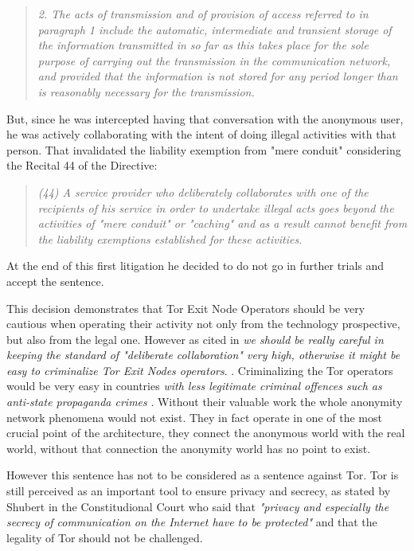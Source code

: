 \documentclass[runningheads,a4paper]{llncs}
\begin{document}
\begin{quote}
    \textit{2. The acts of transmission and of provision of access referred to in paragraph 1 include the automatic, intermediate and transient storage of the information transmitted in so far as this takes place for the sole purpose of carrying out the transmission in the communication network, and provided that the information is not stored for any period longer than is reasonably necessary for the transmission.}
\end{quote}

But, since he was intercepted having that conversation with the anonymous user, he was actively collaborating with the intent of doing illegal activities with that person. That invalidated the liability exemption from "mere conduit" considering the Recital 44 of the Directive:

\begin{quote}
    \textit{
(44) A service provider who deliberately collaborates with one of the recipients of his service in order to undertake illegal acts goes beyond the activities of "mere conduit" or "caching" and as a result cannot benefit from the liability exemptions established for these activities.}
\end{quote}

At the end of this first litigation he decided to do not go in further trials and accept the sentence.

This decision demonstrates that Tor Exit Node Operators should be very cautious when operating their activity not only from the technology prospective, but also from the legal one. However as cited in \cite{HUSOVEC} \textit{we should be really careful in keeping the standard of "deliberate collaboration" very high, otherwise it might be easy to criminalize Tor Exit Nodes operators}. . Criminalizing the Tor operators would be very easy in countries \textit{with less legitimate criminal offences such as anti-state propaganda crimes} \cite{HUSOVEC}. Without their valuable work the whole anonymity network phenomena would not exist. They in fact operate in one of the most crucial point of the architecture, they connect the anonymous world with the real world, without that connection the anonymity world has no point to exist.

However this sentence has not to be considered as a sentence against Tor. Tor is still perceived as an important tool to ensure privacy and secrecy, as stated by  Shubert in the Constitudional Court who said that \textit{"privacy and especially the secrecy of communication on the Internet have to be protected"} and that the legality of Tor should not be challenged. \cite{PCW}
\end{document}
